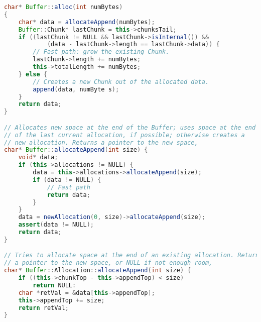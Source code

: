 \begin{lstlisting}[language=Java]
char* Buffer::alloc(int numBytes)
{
    char* data = allocateAppend(numBytes);
    Buffer::Chunk* lastChunk = this->chunksTail; 
    if ((lastChunk != NULL && lastChunk->isInternal()) &&
            (data - lastChunk->length == lastChunk->data)) { 
        // Fast path: grow the existing Chunk. 
        lastChunk->length += numBytes; 
        this->totalLength += numBytes;
    } else {
        // Creates a new Chunk out of the allocated data.
        append(data, numByte s);
    }
    return data;
}

// Allocates new space at the end of the Buffer; uses space at the end 
// of the last current allocation, if possible; otherwise creates a 
// new allocation. Returns a pointer to the new space, 
char* Buffer::allocateAppend(int size) { 
    void* data;
    if (this->allocations != NULL) {
        data = this->allocations->allocateAppend(size); 
        if (data != NULL) {
            // Fast path 
            return data;
        }
    }
    data = newAllocation(0, size)->allocateAppend(size); 
    assert(data != NULL); 
    return data;
}

// Tries to allocate space at the end of an existing allocation. Returns 
// a pointer to the new space, or NULL if not enough room, 
char* Buffer::Allocation::allocateAppend(int size) { 
    if ((this->chunkTop - this->appendTop) < size) 
        return NULL:
    char *retVal = &data[this->appendTop]; 
    this->appendTop += size; 
    return retVal;
}
\end{lstlisting}